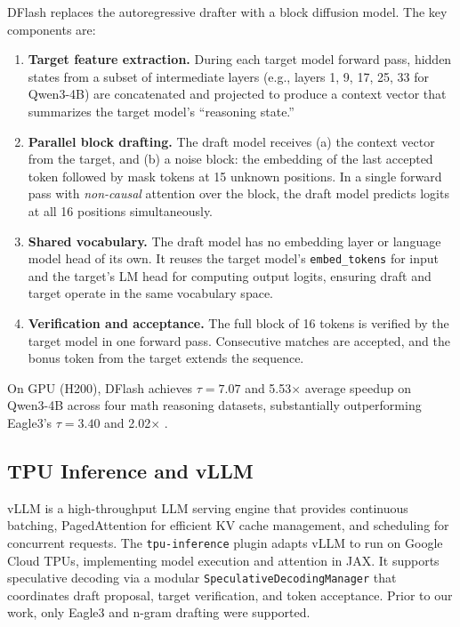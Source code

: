 \documentclass[12pt,letterpaper]{article}
\begin{document}
DFlash \citep{chen2026dflashblockdiffusionflash} replaces the autoregressive drafter with a block diffusion model. The key components are:

\begin{enumerate}
    \item \textbf{Target feature extraction.} During each target model forward pass, hidden states from a subset of intermediate layers (e.g., layers 1, 9, 17, 25, 33 for Qwen3-4B) are concatenated and projected to produce a context vector that summarizes the target model's ``reasoning state.''
    \item \textbf{Parallel block drafting.} The draft model receives (a) the context vector from the target, and (b) a noise block: the embedding of the last accepted token followed by mask tokens at 15 unknown positions. In a single forward pass with \emph{non-causal} attention over the block, the draft model predicts logits at all 16 positions simultaneously.
    \item \textbf{Shared vocabulary.} The draft model has no embedding layer or language model head of its own. It reuses the target model's \texttt{embed\_tokens} for input and the target's LM head for computing output logits, ensuring draft and target operate in the same vocabulary space.
    \item \textbf{Verification and acceptance.} The full block of 16 tokens is verified by the target model in one forward pass. Consecutive matches are accepted, and the bonus token from the target extends the sequence.
\end{enumerate}

On GPU (H200), DFlash achieves $\tau=7.07$ and 5.53$\times$ average speedup on Qwen3-4B across four math reasoning datasets, substantially outperforming Eagle3's $\tau=3.40$ and 2.02$\times$ \citep{chen2026dflashblockdiffusionflash}.

\subsection{TPU Inference and vLLM}

vLLM \citep{kwon2023efficientmemorymanagementlarge} is a high-throughput LLM serving engine that provides continuous batching, PagedAttention for efficient KV cache management, and scheduling for concurrent requests. The \texttt{tpu-inference} plugin \citep{tpuinference} adapts vLLM to run on Google Cloud TPUs, implementing model execution and attention in JAX. It supports speculative decoding via a modular \texttt{SpeculativeDecodingManager} that coordinates draft proposal, target verification, and token acceptance. Prior to our work, only Eagle3 and n-gram drafting were supported.
\end{document}
